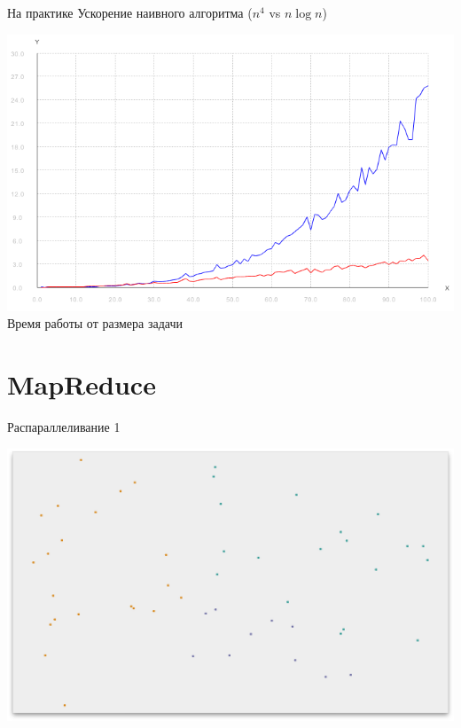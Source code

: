 \documentclass[14pt, fleqn, xcolor={dvipsnames, table}]{beamer}
\begin{document}
        \begin{frame}{На практике}
            Ускорение наивного алгоритма  ($n^4$ vs $n\log n$)
            \begin{center}
                \includegraphics[scale=0.4]{comparison.png}\\
                Время работы от размера задачи   
            \end{center}  
                  
        \end{frame}
        
    \section{MapReduce}
        
        \begin{frame}{Распараллеливание 1}
            \begin{center}
                \includegraphics[scale=0.295]{4.png}
            \end{center}             
        \end{frame}
        
\end{document}
